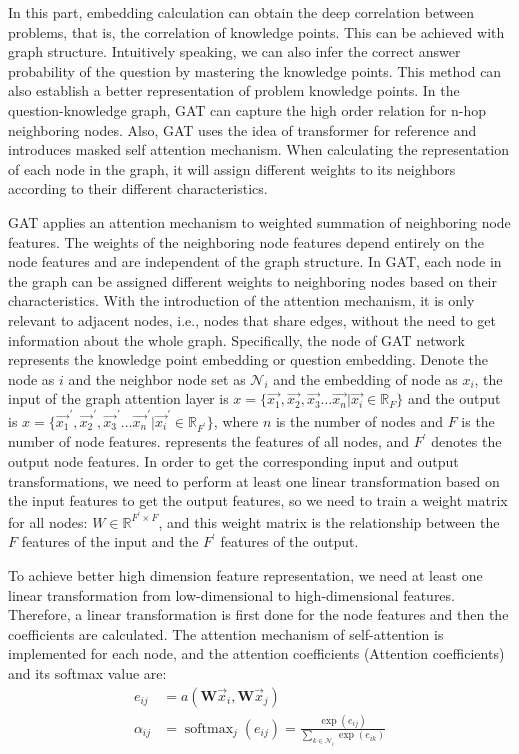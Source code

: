 In this part, embedding calculation can obtain the deep correlation between problems, that is, the correlation of knowledge points. This can be achieved with graph structure. Intuitively speaking, we can also infer the correct answer probability of the question by mastering the knowledge points. This method can also establish a better representation of problem knowledge points. In the question-knowledge graph, GAT can capture the high order relation for n-hop neighboring nodes. Also, GAT uses the idea of transformer for reference and introduces masked self attention mechanism. When calculating the representation of each node in the graph, it will assign different weights to its neighbors according to their different characteristics.

GAT applies an attention mechanism to weighted summation of neighboring node features. The weights of the neighboring node features depend entirely on the node features and are independent of the graph structure. In GAT, each node in the graph can be assigned different weights to neighboring nodes based on their characteristics. With the introduction of the attention mechanism, it is only relevant to adjacent nodes, i.e., nodes that share edges, without the need to get information about the whole graph. Specifically, the node of GAT network represents the knowledge point embedding or question embedding. Denote the node as \(i\) and the neighbor node set as \(\mathcal{N}_{i}\) and the embedding of node as \(x_i\), the input of the graph attention layer is \(x=\{\overrightarrow{x_{1}}, \overrightarrow{x_{2}}, \overrightarrow{x_{3}} \ldots \overrightarrow{x_{n}}|\overrightarrow{x_{i}}\in \mathbb{R}_{F}\}\) and the output is \(x=\{\overrightarrow{x_{1}}^{\prime}, \overrightarrow{x_{2}}^{\prime}, \overrightarrow{x_{3}}^{\prime} \ldots \overrightarrow{x_{n}}^{\prime}|\overrightarrow{x_{i}}^\prime\in \mathbb{R}_{F^\prime}\}\), where \(n\) is the number of nodes and \(F\) is the number of node features. represents the features of all nodes, and \(F^{\prime}\) denotes the output node features. In order to get the corresponding input and output transformations, we need to perform at least one linear transformation based on the input features to get the output features, so we need to train a weight matrix for all nodes: \(W\in \mathbb{R}^{F^{\prime}\times F}\), and this weight matrix is the relationship between the \(F\) features of the input and the \(F^\prime\) features of the output.

To achieve better high dimension feature representation, we need at least one linear transformation from low-dimensional to high-dimensional features. Therefore, a linear transformation is first done for the node features and then the coefficients are calculated. The attention mechanism of self-attention is implemented for each node, and the attention coefficients (Attention coefficients) and its softmax value are:
\begin{align}
	e_{ij}      & =a(\mathbf{W}\vec{x}_{i}, \mathbf{W}\vec{x}_{j})                                                 \\
	\alpha_{ij} & =\operatorname{softmax}_{j}(e_{ij})=\frac{\exp(e_{ij})}{\sum_{k\in \mathcal{N}_{i}}\exp(e_{ik})}
\end{align}

